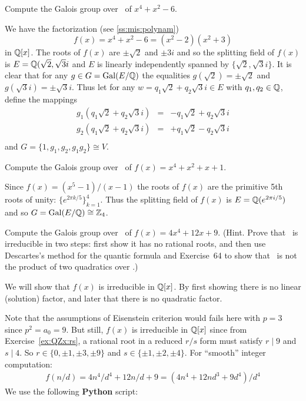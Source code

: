 \begin{myenumerate}
\item
\begin{excopy}
Compute the Galois group over \Q\ of \(x^4 + x^2 - 6\).
\end{excopy}

We have the factorization
 (see \ref{ss:mis:polynam})
\begin{equation*}
f(x) = x^4 + x^2 - 6 = (x^2 - 2)(x^2 + 3)
\end{equation*}
in \(\mathbb{Q}[x]\).
The roots of \(f(x)\)
are \(\pm\sqrt{2}\) and \(\pm3i\) and so the splitting field
of \(f(x)\) is \(E = \mathbb{Q}(\sqrt{2},\sqrt{3}i\)
and $E$ is linearly independently spanned by \(\{\sqrt{2}, \sqrt{3}i\}\).
It is clear that for any \(g\in G = \mathop{\rm Gal}\nolimits(E/\mathbb{Q})\)
the equalities \(g(\sqrt{2}) = \pm\sqrt{2}\)
and \(g(\sqrt{3}i) = \pm\sqrt{3}i\).
Thus let for any \(w = q_1 \sqrt{2} + q_2 \sqrt{3}i \in E\)
with \(q_1,q_2\in\mathbb{Q}\),
define the mappings
\begin{eqnarray*}
g_1(q_1 \sqrt{2} + q_2 \sqrt{3}i) & = & -q_1 \sqrt{2} + q_2 \sqrt{3}i \\
g_2(q_1 \sqrt{2} + q_2 \sqrt{3}i) & = & +q_1 \sqrt{2} - q_2 \sqrt{3}i \\
\end{eqnarray*}
and \(G = \{1,g_1,g_2,g_1g_2\} \cong V\).

\item
\begin{excopy}
Compute the Galois group over \Q\ of \(f(x) = x^4 + x^2 + x + 1\).
\end{excopy}

Since \(f(x) = (x^5 - 1)/(x - 1)\) the roots
of \(f(x)\) are the primitive 5th roots of unity:
\(\{e^{2\pi k/5}\}_{k=1}^4\).
Thus the splitting field of \(f(x)\) is \(E = \mathbb{Q}(e^{2\pi i/5})\)
and so \(G = \mathop{\rm Gal}\nolimits(E/\mathbb{Q}) \cong \mathbb{Z}_4\).

\item
\begin{excopy}
Compute the Galois group over \Q\ of \(f(x) = 4x^4 + 12x + 9\).
(Hint. Prove that \fx\ is irreducible in two steps:
first show it has no rational roots, and then use
Descartes's method for the quantic formula and Exercise~64
to show that \fx\ is not the product of two quadratics over \Q.)
\end{excopy}

We will show that \(f(x)\) is irreducible in \(\mathbb{Q}[x]\).
By first showing there is no linear (solution) factor,
and later that there is no quadratic factor.

Note that the assumptions
of Eisenstein criterion would fails here with \(p=3\) since \(p^2=a_0 = 9\).
But still, \(f(x)\) is irreducible in \(\mathbb{Q}[x]\) since from
Exercise~\ref{ex:QZx:rs}, a rational root
in a reduced \(r/s\) form must satisfy \(r \mid 9\) and \(s\mid 4\).
So \(r\in \{0, \pm 1, \pm 3, \pm 9\}\)
and \(s\in \{\pm 1, \pm 2, \pm 4\}\).
For ``smooth'' integer computation:
\begin{eqnarray*}
f(n/d) = 4n^4/d^4 + 12n/d + 9 = (4n^4 + 12nd^3 + 9d^4)/d^4
\end{eqnarray*}
We use the following
\textbf{Python} script:
{\scriptsize %

}


\end{myenumerate}
